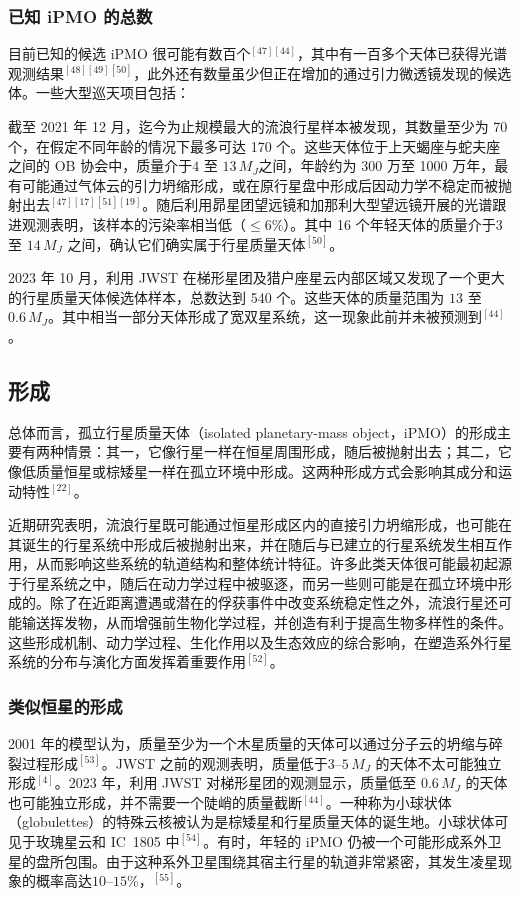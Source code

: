 \subsubsection{已知 iPMO 的总数}
目前已知的候选 iPMO 很可能有数百个$^{[47][44]}$，其中有一百多个天体已获得光谱观测结果$^{[48][49][50]}$，此外还有数量虽少但正在增加的通过引力微透镜发现的候选体。一些大型巡天项目包括：

截至 2021 年 12 月，迄今为止规模最大的流浪行星样本被发现，其数量至少为 70 个，在假定不同年龄的情况下最多可达 170 个。这些天体位于上天蝎座与蛇夫座之间的 OB 协会中，质量介于$4$ 至 $13\,M_J$之间，年龄约为 300 万至 1000 万年，最有可能通过气体云的引力坍缩形成，或在原行星盘中形成后因动力学不稳定而被抛射出去$^{[47][17][51][19]}$。随后利用昴星团望远镜和加那利大型望远镜开展的光谱跟进观测表明，该样本的污染率相当低（$\leq6\%$）。其中 16 个年轻天体的质量介于$3$ 至 $14\,M_J$ 之间，确认它们确实属于行星质量天体$^{[50]}$。

2023 年 10 月，利用 JWST 在梯形星团及猎户座星云内部区域又发现了一个更大的行星质量天体候选体样本，总数达到 540 个。这些天体的质量范围为 $13$ 至 $0.6\,M_J$。其中相当一部分天体形成了宽双星系统，这一现象此前并未被预测到$^{[44]}$。
\subsection{形成}
总体而言，孤立行星质量天体（isolated planetary-mass object，iPMO）的形成主要有两种情景：其一，它像行星一样在恒星周围形成，随后被抛射出去；其二，它像低质量恒星或棕矮星一样在孤立环境中形成。这两种形成方式会影响其成分和运动特性$^{[22]}$。

近期研究表明，流浪行星既可能通过恒星形成区内的直接引力坍缩形成，也可能在其诞生的行星系统中形成后被抛射出来，并在随后与已建立的行星系统发生相互作用，从而影响这些系统的轨道结构和整体统计特征。许多此类天体很可能最初起源于行星系统之中，随后在动力学过程中被驱逐，而另一些则可能是在孤立环境中形成的。除了在近距离遭遇或潜在的俘获事件中改变系统稳定性之外，流浪行星还可能输送挥发物，从而增强前生物化学过程，并创造有利于提高生物多样性的条件。这些形成机制、动力学过程、生化作用以及生态效应的综合影响，在塑造系外行星系统的分布与演化方面发挥着重要作用$^{[52]}$。
\subsubsection{类似恒星的形成}
2001 年的模型认为，质量至少为一个木星质量的天体可以通过分子云的坍缩与碎裂过程形成$^{[53]}$。JWST 之前的观测表明，质量低于$3$--$5\,M_J$ 的天体不太可能独立形成$^{[4]}$。2023 年，利用 JWST 对梯形星团的观测显示，质量低至 $0.6\,M_J$ 的天体也可能独立形成，并不需要一个陡峭的质量截断$^{[44]}$。一种称为小球状体（globulettes）的特殊云核被认为是棕矮星和行星质量天体的诞生地。小球状体可见于玫瑰星云和 IC~1805 中$^{[54]}$。有时，年轻的 iPMO 仍被一个可能形成系外卫星的盘所包围。由于这种系外卫星围绕其宿主行星的轨道非常紧密，其发生凌星现象的概率高达$10$--$15\%$，$^{[55]}$。


